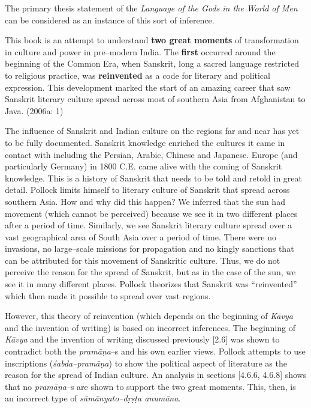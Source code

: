 The primary thesis statement of the \textit{Language of the Gods in the World of Men} can be considered as an instance of this sort of inference.

\begin{myquote}
This book is an attempt to understand \textbf{two great moments} of transformation in culture and power in pre–modern India. The \textbf{first} occurred around the beginning of the Common Era, when Sanskrit, long a sacred language restricted to religious practice, was \textbf{reinvented} as a code for literary and political expression. This development marked the start of an amazing career that saw Sanskrit literary culture spread across most of southern Asia from Afghanistan to Java. (2006a: 1)
\end{myquote}

The influence of Sanskrit and Indian culture on the regions far and near has yet to be fully documented. Sanskrit knowledge enriched the cultures it came in contact with including the Persian, Arabic, Chinese and Japanese. Europe (and particularly Germany) in 1800 C.E. came alive with the coming of Sanskrit knowledge. This is a history of Sanskrit that needs to be told and retold in great detail. Pollock limits himself to literary culture of Sanskrit that spread across southern Asia. How and why did this happen? We inferred that the sun had movement (which cannot be perceived) because we see it in two different places after a period of time. Similarly, we see Sanskrit literary culture spread over a vast geographical area of South Asia over a period of time. There were no invasions, no large–scale missions for propagation and no kingly sanctions that can be attributed for this movement of Sanskritic culture. Thus, we do not perceive the reason for the spread of Sanskrit, but as in the case of the sun, we see it in many different places. Pollock theorizes that Sanskrit was “reinvented” which then made it possible to spread over vast regions.

However, this theory of reinvention (which depends on the beginning of \textit{Kāvya} and the invention of writing) is based on incorrect inferences. The beginning of \textit{Kāvya} and the invention of writing discussed previously [2.6] was shown to contradict both the \textit{pramāṇa}–s and his own earlier views. Pollock attempts to use inscriptions (\textit{śabda–pramāṇa}) to show the political aspect of literature as the reason for the spread of Indian culture. An analysis in sections [4.6.6, 4.6.8] shows that no\textit{ pramāṇa}–s are shown to support the two great moments. This, then, is an incorrect type of \textit{sāmānyato–dṛṣṭa anumāna}.

